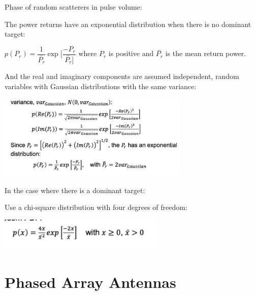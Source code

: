 \documentclass[10pt]{article}
\renewcommand{\frac}{\dfrac}
\begin{document}
\begin{enumerate}
Phase of random scatterers in pulse volume:

The power returns have an exponential distribution when there is no dominant target:

$p(P_r) = \frac{1}{\bar{P_r}}\exp [\frac{-P_r}{\bar{P_r}]}$ where $P_r$ is positive and $\bar{P_r}$ is the mean return power.


And the real and imaginary components are assumed independent, random variables with Gaussian distributions with the same variance: 


\includegraphics[width=0.69\textwidth]{figs/return_power_pdf.png}


In the case where there is a dominant target:

Use a chi-square distribution with four degrees of freedom:

\includegraphics[width=0.59\textwidth]{figs/chi_squared.png}

\end{enumerate}

\pagebreak

\section{Phased Array Antennas}
\end{document}
